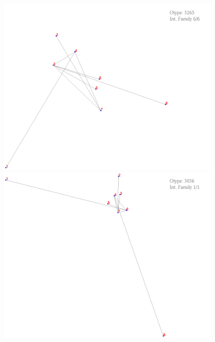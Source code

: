 \documentclass[11pt,epsf,times,letterpaper]{article}
\begin{document}
	\begin{figure}
		\includegraphics[scale=.4]{if_tam0_tam1/9.png}
		\includegraphics[scale=.4]{if_tam0_tam1/10.png}
	\end{figure}
	
\end{document}
